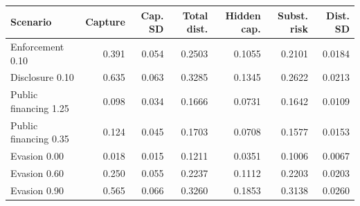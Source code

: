 \begingroup
\begin{center}
\begin{minipage}{\textwidth}
\centering
\footnotesize
\setlength{\tabcolsep}{3pt}
\begin{tabular*}{\textwidth}{@{\extracolsep{\fill}}lrrrrrr@{}}
\toprule
Scenario & Capture & Cap. SD & Total dist. & Hidden cap. & Subst. risk & Dist. SD \\
\midrule
Enforcement 0.10 & 0.391 & 0.054 & 0.2503 & 0.1055 & 0.2101 & 0.0184 \\
Disclosure 0.10 & 0.635 & 0.063 & 0.3285 & 0.1345 & 0.2622 & 0.0213 \\
Public financing 1.25 & 0.098 & 0.034 & 0.1666 & 0.0731 & 0.1642 & 0.0109 \\
Public financing 0.35 & 0.124 & 0.045 & 0.1703 & 0.0708 & 0.1577 & 0.0153 \\
Evasion 0.00 & 0.018 & 0.015 & 0.1211 & 0.0351 & 0.1006 & 0.0067 \\
Evasion 0.60 & 0.250 & 0.055 & 0.2237 & 0.1112 & 0.2203 & 0.0203 \\
Evasion 0.90 & 0.565 & 0.066 & 0.3260 & 0.1853 & 0.3138 & 0.0260 \\
\bottomrule
\end{tabular*}
\par\smallskip
\captionsetup{hypcap=false}
\label{tab:sensitivity}
\end{minipage}
\end{center}
\endgroup
